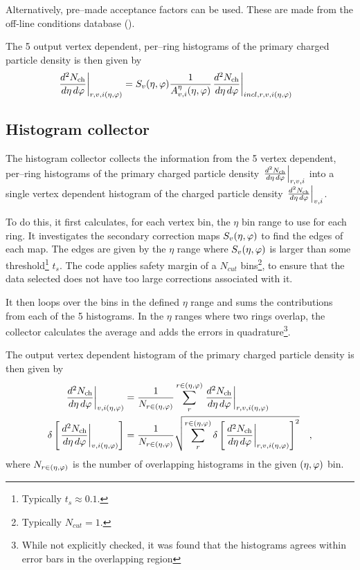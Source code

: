 \documentclass[11pt]{article}
\def\AlwaysText#1{\ifmmode\relax\text{#1}\else #1\fi}
\newcommand{\AbbrName}[1]{\AlwaysText{{\scshape #1}}}
\newcommand{\OCDB}{\AbbrName{ocdb}}
\newcommand{\mult}[1][]{\ensuremath N_{\text{ch}#1}}
\newcommand{\dndetadphi}[1][]{{\ensuremath%
    \ifx|#1|\else\left.\fi%
    \frac{d^2\mult{}}{d\eta\,d\varphi}%
    \ifx|#1|\else\right|_{#1}\fi%
}}
\newcommand{\etaphi}{\ensuremath(\eta,\varphi)}
\newcommand{\DeadCh}{\ensuremath A^{\eta}_{v,i}\etaphi}
\newcommand{\SecMap}{\ensuremath S_v\etaphi}
\begin{document}
Alternatively, pre--made acceptance factors can be used.  These are
made from the off-line conditions database (\OCDB{}).

The 5 output vertex dependent, per--ring histograms of the primary
charged particle density is then given by
\begin{align}
  \dndetadphi[r,v,i\etaphi] &=
  \SecMap{} \frac{1}{\DeadCh{}}\dndetadphi[incl,r,v,i\etaphi]
\end{align}

\subsection{Histogram collector}
\label{sec:sub:hist_collector}

The histogram collector collects the information from the 5 vertex
dependent, per--ring histograms of the primary charged particle
density $\dndetadphi[r,v,i]$ into a single vertex dependent histogram
of the charged particle density $\dndetadphi[v,i]$.  

To do this, it first calculates, for each vertex bin, the $\eta$ bin
range to use for each ring.  It investigates the secondary correction
maps $\SecMap{}$ to find the edges of each map.  The edges are given
by the $\eta$ range where $\SecMap{}$ is larger than some
threshold\footnote{Typically $t_s\approx 0.1$.}  $t_s$. The code
applies safety margin of a $N_{cut}$ bins\footnote{Typically
  $N_{cut}=1$.}, to ensure that the data selected does not have too
large corrections associated with it.

It then loops over the bins in the defined $\eta$ range and sums the
contributions from each of the 5 histograms.  In the $\eta$ ranges
where two rings overlap, the collector calculates the average and adds
the errors in quadrature\footnote{While not explicitly checked, it was
  found that the histograms agrees within error bars in the
  overlapping region}.

The output vertex dependent histogram of the primary
charged particle density is then given by
\begin{align}
  \label{eq:superhist}
  \dndetadphi[v,i\etaphi] &=
  \frac{1}{N_{r\in\etaphi}}\sum_{r}^{r\in\etaphi}  
  \dndetadphi[r,v,i\etaphi]\\
  \delta\left[\dndetadphi[v,i\etaphi]\right] &=
  \frac{1}{N_{r\in\etaphi}}\sqrt{\sum_{r}^{r\in\etaphi}   
    \delta\left[\dndetadphi[r,v,i\etaphi]\right]^2}
  \quad,
\end{align}
where $N_{r\in\etaphi}$ is the number of overlapping histograms
in the given $\etaphi$ bin. 
\end{document}
